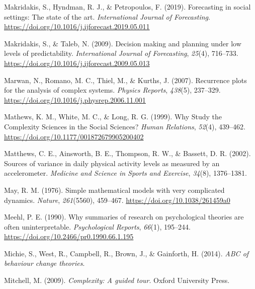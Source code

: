 \documentclass[
  british,
  man,floatsintext]{apa6}
\begin{document}
\leavevmode\hypertarget{ref-makridakisForecastingSocialSettings2019}{}%
Makridakis, S., Hyndman, R. J., \& Petropoulos, F. (2019). Forecasting in social settings: The state of the art. \emph{International Journal of Forecasting}. \url{https://doi.org/10.1016/j.ijforecast.2019.05.011}

\leavevmode\hypertarget{ref-makridakisDecisionMakingPlanning2009}{}%
Makridakis, S., \& Taleb, N. (2009). Decision making and planning under low levels of predictability. \emph{International Journal of Forecasting}, \emph{25}(4), 716--733. \url{https://doi.org/10.1016/j.ijforecast.2009.05.013}

\leavevmode\hypertarget{ref-marwanRecurrencePlotsAnalysis2007}{}%
Marwan, N., Romano, M. C., Thiel, M., \& Kurths, J. (2007). Recurrence plots for the analysis of complex systems. \emph{Physics Reports}, \emph{438}(5), 237--329. \url{https://doi.org/10.1016/j.physrep.2006.11.001}

\leavevmode\hypertarget{ref-mathewsWhyStudyComplexity1999}{}%
Mathews, K. M., White, M. C., \& Long, R. G. (1999). Why Study the Complexity Sciences in the Social Sciences? \emph{Human Relations}, \emph{52}(4), 439--462. \url{https://doi.org/10.1177/001872679905200402}

\leavevmode\hypertarget{ref-matthewsSourcesVarianceDaily2002}{}%
Matthews, C. E., Ainsworth, B. E., Thompson, R. W., \& Bassett, D. R. (2002). Sources of variance in daily physical activity levels as measured by an accelerometer. \emph{Medicine and Science in Sports and Exercise}, \emph{34}(8), 1376--1381.

\leavevmode\hypertarget{ref-maySimpleMathematicalModels1976}{}%
May, R. M. (1976). Simple mathematical models with very complicated dynamics. \emph{Nature}, \emph{261}(5560), 459--467. \url{https://doi.org/10.1038/261459a0}

\leavevmode\hypertarget{ref-meehlWhySummariesResearch1990}{}%
Meehl, P. E. (1990). Why summaries of research on psychological theories are often uninterpretable. \emph{Psychological Reports}, \emph{66}(1), 195--244. \url{https://doi.org/10.2466/pr0.1990.66.1.195}

\leavevmode\hypertarget{ref-michieABCBehaviourChange2014}{}%
Michie, S., West, R., Campbell, R., Brown, J., \& Gainforth, H. (2014). \emph{ABC of behaviour change theories}.

\leavevmode\hypertarget{ref-mitchellComplexityGuidedTour2009}{}%
Mitchell, M. (2009). \emph{Complexity: A guided tour}. Oxford University Press.
\end{document}
